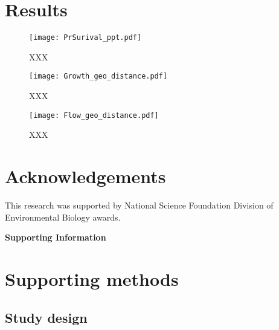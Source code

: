 \documentclass[12pt]{article}\usepackage[]{graphicx}\usepackage[dvipsnames]{xcolor}
\begin{document}
\section*{Results}

\begin{figure}[H]
\centering
\texttt{[image: PrSurival\_ppt.pdf]}
\caption{XXX 
}
\label{fig:climate}
\end{figure}

\begin{figure}[H]
\centering
\texttt{[image: Growth\_geo\_distance.pdf]}
\caption{XXX 
}
\label{fig:climate}
\end{figure}

\begin{figure}[H]
\centering
\texttt{[image: Flow\_geo\_distance.pdf]}
\caption{XXX 
}
\label{fig:climate}
\end{figure}

%
%

\section*{Acknowledgements}
This research was supported by National Science Foundation Division of Environmental Biology awards.



\newpage


\newpage
\clearpage 
\setcounter{equation}{0}
\setcounter{figure}{0}
\setcounter{section}{0}
\setcounter{table}{0}
\renewcommand{\theequation}{S.\arabic{equation}}
\renewcommand{\thetable}{S-\arabic{table}}
\renewcommand{\thefigure}{S-\arabic{figure}}
\renewcommand{\thesection}{S.\arabic{section}}

\centerline{\Large{\textbf{Supporting Information}}}
\section {Supporting methods}
\subsection*{Study design}
\end{document}
